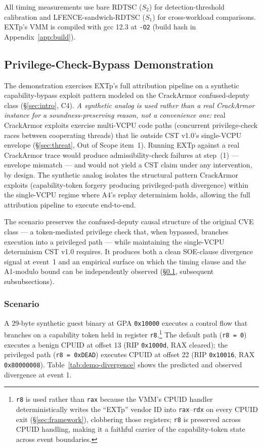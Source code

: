 \documentclass[conference]{IEEEtran}
\begin{document}
All timing measurements use bare RDTSC ($S_2$) for
detection-threshold calibration and LFENCE-sandwich-RDTSC ($S_1$)
for cross-workload comparisons. EXTp's VMM is compiled with gcc 12.3
at \texttt{-O2} (build hash in Appendix~\ref{app:build}).

\subsection{Privilege-Check-Bypass Demonstration}\label{sec:eval-demo}

The demonstration exercises EXTp's full attribution pipeline on a
synthetic capability-bypass exploit pattern modeled on the
CrackArmor confused-deputy class (\S\ref{sec:intro}, C4).
\emph{A synthetic analog is used rather than a real CrackArmor
instance for a soundness-preserving reason, not a convenience one:}
real CrackArmor exploits exercise multi-VCPU code paths (concurrent
privilege-check races between cooperating threads) that lie outside
CST v1.0's single-VCPU envelope (\S\ref{sec:threat}, Out of Scope
item~1). Running EXTp against a real CrackArmor trace would produce
admissibility-check failures at step~(1) --- envelope mismatch ---
and would not yield a CST claim under any intervention, by design.
The synthetic analog isolates the structural pattern CrackArmor
exploits (capability-token forgery producing privileged-path
divergence) within the single-VCPU regime where A4's replay
determinism holds, allowing the full attribution pipeline to
execute end-to-end.

The scenario preserves the confused-deputy causal structure of the
original CVE class --- a token-mediated privilege check that, when
bypassed, branches execution into a privileged path --- while
maintaining the single-VCPU determinism CST v1.0 requires. It
produces both a clean SOE-clause divergence signal at event~1 and
an empirical surface on which the timing clause and the A1-modulo
bound can be independently observed
(\S\ref{sec:eval-demo}, subsequent subsubsections).

\subsubsection{Scenario}

A 29-byte synthetic guest binary at GPA \texttt{0x10000} executes a
control flow that branches on a capability token held in register
\texttt{r8}.\footnote{\texttt{r8} is used rather than \texttt{rax}
because the VMM's CPUID handler deterministically writes the
``EXTp'' vendor ID into \texttt{rax}--\texttt{rdx} on every CPUID
exit (\S\ref{sec:framework}), clobbering those registers; \texttt{r8}
is preserved across CPUID handling, making it a faithful carrier of
the capability-token state across event boundaries.} The default
path (\texttt{r8 = 0}) executes a benign CPUID at offset 13
(RIP \texttt{0x1000d}, RAX cleared); the privileged path
(\texttt{r8 = 0xDEAD}) executes CPUID at offset 22
(RIP \texttt{0x10016}, RAX \texttt{0x80000008}).
Table~\ref{tab:demo-divergence} shows the predicted and observed
divergence at event 1.
\end{document}
